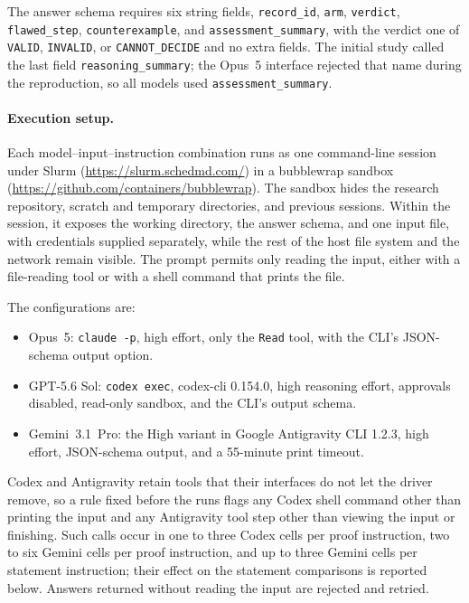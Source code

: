 The answer schema requires six string fields, \texttt{record\_id}, \texttt{arm}, \texttt{verdict}, \texttt{flawed\_step}, \texttt{counterexample}, and \texttt{assessment\_summary}, with the verdict one of \texttt{VALID}, \texttt{INVALID}, or \texttt{CANNOT\_DECIDE} and no extra fields. The initial study called the last field \texttt{reasoning\_summary}; the Opus~5 interface rejected that name during the reproduction, so all models used \texttt{assessment\_summary}.

\paragraph{Execution setup.}
Each model--input--instruction combination runs as one command-line session under Slurm (\url{https://slurm.schedmd.com/}) in a bubblewrap sandbox (\url{https://github.com/containers/bubblewrap}). The sandbox hides the research repository, scratch and temporary directories, and previous sessions. Within the session, it exposes the working directory, the answer schema, and one input file, with credentials supplied separately, while the rest of the host file system and the network remain visible. The prompt permits only reading the input, either with a file-reading tool or with a shell command that prints the file.

The configurations are:
\begin{itemize}
\item Opus~5: \texttt{claude -p}, high effort, only the \texttt{Read} tool,
with the CLI's JSON-schema output option.
\item GPT-5.6 Sol: \texttt{codex exec}, codex-cli 0.154.0, high reasoning
effort, approvals disabled, read-only sandbox, and the CLI's output schema.
\item Gemini~3.1~Pro: the High variant in Google Antigravity CLI 1.2.3,
high effort, JSON-schema output, and a 55-minute print timeout.
\end{itemize}

Codex and Antigravity retain tools that their interfaces do not let the driver remove, so a rule fixed before the runs flags any Codex shell command other than printing the input and any Antigravity tool step other than viewing the input or finishing. Such calls occur in one to three Codex cells per proof instruction, two to six Gemini cells per proof instruction, and up to three Gemini cells per statement instruction; their effect on the statement comparisons is reported below. Answers returned without reading the input are rejected and retried.

